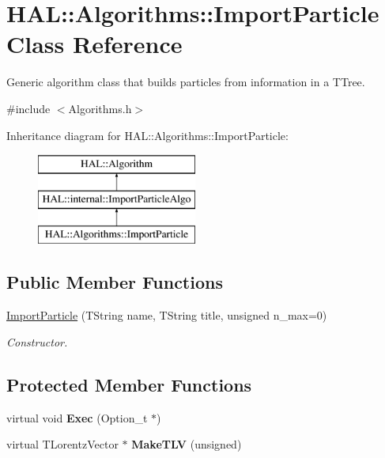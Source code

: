 \hypertarget{class_h_a_l_1_1_algorithms_1_1_import_particle}{\section{H\+A\+L\+:\+:Algorithms\+:\+:Import\+Particle Class Reference}
\label{class_h_a_l_1_1_algorithms_1_1_import_particle}
}


Generic algorithm class that builds particles from information in a T\+Tree.  




{\ttfamily \#include $<$Algorithms.\+h$>$}

Inheritance diagram for H\+A\+L\+:\+:Algorithms\+:\+:Import\+Particle\+:\begin{figure}[H]
\begin{center}
\leavevmode
\includegraphics[height=3.000000cm]{class_h_a_l_1_1_algorithms_1_1_import_particle}
\end{center}
\end{figure}
\subsection*{Public Member Functions}
\begin{DoxyCompactItemize}
\item 
\hyperlink{class_h_a_l_1_1_algorithms_1_1_import_particle_ab42dcac49ed8ae1f565346ec7372c7a5}{Import\+Particle} (T\+String name, T\+String title, unsigned n\+\_\+max=0)
\begin{DoxyCompactList}\small\item\em Constructor. \end{DoxyCompactList}\end{DoxyCompactItemize}
\subsection*{Protected Member Functions}
\begin{DoxyCompactItemize}
\item 
\hypertarget{class_h_a_l_1_1_algorithms_1_1_import_particle_a1e5924b9deb6c7d1c1d1734b8cb510cb}{virtual void {\bfseries Exec} (Option\+\_\+t $\ast$)}\label{class_h_a_l_1_1_algorithms_1_1_import_particle_a1e5924b9deb6c7d1c1d1734b8cb510cb}

\item 
\hypertarget{class_h_a_l_1_1_algorithms_1_1_import_particle_abad1a5a9b44becfae4e4a7113edc80eb}{virtual T\+Lorentz\+Vector $\ast$ {\bfseries Make\+T\+L\+V} (unsigned)}\label{class_h_a_l_1_1_algorithms_1_1_import_particle_abad1a5a9b44becfae4e4a7113edc80eb}

\end{DoxyCompactItemize}


